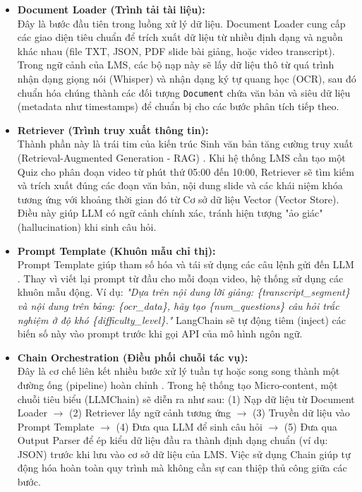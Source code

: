 \begin{itemize}
    \item[\textbf{a.}] \textbf{Document Loader (Trình tải tài liệu):} \\
    Đây là bước đầu tiên trong luồng xử lý dữ liệu. Document Loader cung cấp các giao diện tiêu chuẩn để trích xuất dữ liệu từ nhiều định dạng và nguồn khác nhau (file TXT, JSON, PDF slide bài giảng, hoặc video transcript). Trong ngữ cảnh của LMS, các bộ nạp này sẽ lấy dữ liệu thô từ quá trình nhận dạng giọng nói (Whisper) và nhận dạng ký tự quang học (OCR), sau đó chuẩn hóa chúng thành các đối tượng \texttt{Document} chứa văn bản và siêu dữ liệu (metadata như timestamps) để chuẩn bị cho các bước phân tích tiếp theo.
    
    \item[\textbf{b.}] \textbf{Retriever (Trình truy xuất thông tin):} \\
    Thành phần này là trái tim của kiến trúc Sinh văn bản tăng cường truy xuất (Retrieval-Augmented Generation - RAG) \cite{lewis2020retrieval}. Khi hệ thống LMS cần tạo một Quiz cho phân đoạn video từ phút thứ 05:00 đến 10:00, Retriever sẽ tìm kiếm và trích xuất đúng các đoạn văn bản, nội dung slide và các khái niệm khóa tương ứng với khoảng thời gian đó từ Cơ sở dữ liệu Vector (Vector Store). Điều này giúp LLM có ngữ cảnh chính xác, tránh hiện tượng "ảo giác" (hallucination) khi sinh câu hỏi.
    
    \item[\textbf{c.}] \textbf{Prompt Template (Khuôn mẫu chỉ thị):} \\
    Prompt Template giúp tham số hóa và tái sử dụng các câu lệnh gửi đến LLM \cite{white2023prompt}. Thay vì viết lại prompt từ đầu cho mỗi đoạn video, hệ thống sử dụng các khuôn mẫu động. Ví dụ: \textit{"Dựa trên nội dung lời giảng: \{transcript\_segment\} và nội dung trên bảng: \{ocr\_data\}, hãy tạo \{num\_questions\} câu hỏi trắc nghiệm ở độ khó \{difficulty\_level\}."} LangChain sẽ tự động tiêm (inject) các biến số này vào prompt trước khi gọi API của mô hình ngôn ngữ.
    
    \item[\textbf{d.}] \textbf{Chain Orchestration (Điều phối chuỗi tác vụ):} \\
    Đây là cơ chế liên kết nhiều bước xử lý tuần tự hoặc song song thành một đường ống (pipeline) hoàn chỉnh \cite{wu2022promptchainer}. Trong hệ thống tạo Micro-content, một chuỗi tiêu biểu (LLMChain) sẽ diễn ra như sau: 
    (1) Nạp dữ liệu từ Document Loader $\rightarrow$ 
    (2) Retriever lấy ngữ cảnh tương ứng $\rightarrow$ 
    (3) Truyền dữ liệu vào Prompt Template $\rightarrow$ 
    (4) Đưa qua LLM để sinh câu hỏi $\rightarrow$ 
    (5) Đưa qua Output Parser để ép kiểu dữ liệu đầu ra thành định dạng chuẩn (ví dụ: JSON) trước khi lưu vào cơ sở dữ liệu của LMS. Việc sử dụng Chain giúp tự động hóa hoàn toàn quy trình mà không cần sự can thiệp thủ công giữa các bước.
\end{itemize}

